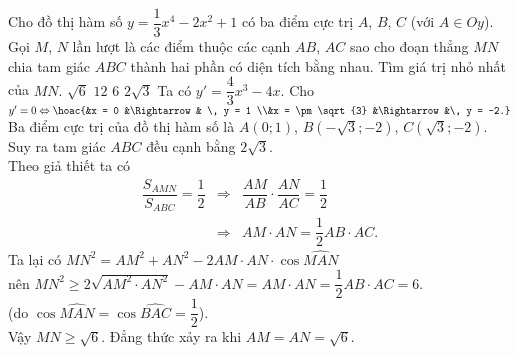 \begin{ex}%
Cho đồ thị hàm số $ y = \dfrac{1}{3} x^4 - 2x^2 + 1 $ có ba điểm cực trị $ A $, $ B $, $ C $ (với $ A \in Oy $). Gọi $ M $, $ N $ lần lượt là các điểm thuộc các cạnh $ AB $, $ AC $ sao cho đoạn thẳng $ MN $ chia tam giác $ ABC $ thành hai phần có diện tích bằng nhau. Tìm giá trị nhỏ nhất của $ MN. $
	\choice
	{\True $ \sqrt{6} $}
	{ $ 12 $}
	{$ 6 $}
	{ $ 2\sqrt{3} $}
	\loigiai
{Ta có $ y' = \dfrac{4}{3}x^3 - 4x. $ Cho $ y' = 0 \Leftrightarrow \hoac{&x = 0 &\Rightarrow& \, y = 1 \\&x = \pm \sqrt{3} &\Rightarrow&\, y = -2.} $\\
Ba điểm cực trị của đồ thị hàm số là $ A(0;1) $, $ B\left(-\sqrt{3};-2\right) $, $ C\left(\sqrt{3};-2\right) $. Suy ra tam giác $ ABC $ đều cạnh bằng $ 2\sqrt{3}. $\\
Theo giả thiết ta có 
\begin{eqnarray*}
\dfrac{S_{AMN}}{S_{ABC}} = \dfrac{1}{2} &\Rightarrow& \dfrac{AM}{AB} \cdot \dfrac{AN}{AC} = \dfrac{1}{2} \\ &\Rightarrow& AM \cdot AN = \dfrac{1}{2} AB \cdot AC.
\end{eqnarray*}
Ta lại có $ MN^2 = AM^2 + AN^2 - 2AM \cdot AN \cdot \cos \widehat{MAN} $ \\ nên
$ MN^2 \ge 2 \sqrt{AM^2 \cdot AN^2} - AM \cdot AN = AM \cdot AN = \dfrac{1}{2} AB \cdot AC = 6.  $ \\
(do $ \cos \widehat{MAN} = \cos \widehat{BAC} = \dfrac{1}{2} $).\\
Vậy $ MN \ge \sqrt{6}. $ Đẳng thức xảy ra khi $ AM = AN = \sqrt{6}. $
}	
\end{ex}

